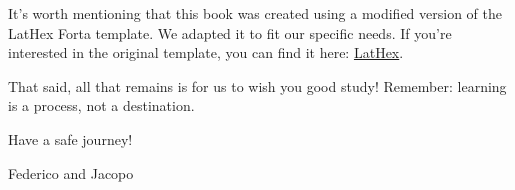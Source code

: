 \documentclass[11pt,fleqn,oneside]{book} %
\begin{document}
It's worth mentioning that this book was created using a modified version of the LatHex Forta template. We adapted it to fit our specific needs. If you're interested in the original template, you can find it here: \href{https://github.com/apehex/lathex-template}{LatHex}. 


That said, all that remains is for us to wish you good study! Remember: learning is a process, not a destination. 

Have a safe journey!

\hfill Federico and Jacopo
\newpage
\tableofcontents


% 

% 

% 

% 

% 

% 
\end{document}
